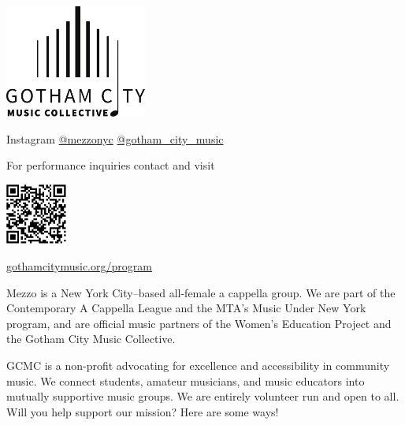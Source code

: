 \documentclass{article}[10pt]
\newcommand{\logo}{
        {\includegraphics[width=0.35\textwidth]{../graphic_design_assets/bw_logo_full}}
}
\newcommand{\tunespaceback}{\vspace{0.1in}}
\begin{document}
    \begin{center}
    {\logo}

    \vfill

        \begin{minipage}{4.2in}

            \begin{center}

                \faInstagram{}{} Instagram \href{https://www.instagram.com/mezzonyc}{@mezzonyc} \href{https://www.instagram.com/gotham_city_music/}{@gotham\_city\_music}

                For performance inquiries contact
                    {\textbf{}}
                and visit
                    {\textbf{}}
            \end{center}

            \begin{center}
            {\textbf{}}

                \tunespaceback

                {\includegraphics[width=0.15\textwidth]{../graphic_design_assets/gotham_city_music_collective_program.png}}

                \href{https://gothamcitymusic.org/program}{gothamcitymusic.org/program}
            \end{center}

            \begin{small}
                Mezzo is a New York City–based all-female a cappella group.
                We are part of the Contemporary A Cappella League and the MTA's Music Under New York program,
                and are official music partners of the Women's Education Project and the Gotham City Music Collective.

                GCMC is a non-profit advocating for excellence and accessibility in community music.
                We connect students, amateur musicians, and music educators into mutually supportive music groups.
                We are entirely volunteer run and open to all.
                Will you help support our mission?
                Here are some ways!
            \end{small}


\end{minipage}
\end{center}
\end{document}
